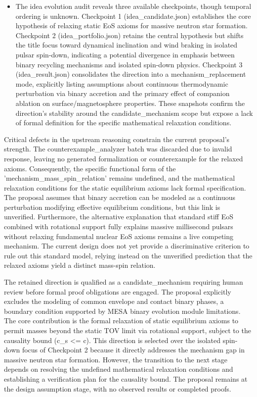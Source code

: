 \documentclass[conference]{IEEEtran}
\begin{document}
\begin{itemize}
\item The idea evolution audit reveals three available checkpoints, though temporal ordering is unknown. Checkpoint 1 (idea\_candidate.json) establishes the core hypothesis of relaxing static EoS axioms for massive neutron star formation. Checkpoint 2 (idea\_portfolio.json) retains the central hypothesis but shifts the title focus toward dynamical inclination and wind braking in isolated pulsar spin-down, indicating a potential divergence in emphasis between binary recycling mechanisms and isolated spin-down physics. Checkpoint 3 (idea\_result.json) consolidates the direction into a mechanism\_replacement mode, explicitly listing assumptions about continuous thermodynamic perturbation via binary accretion and the primary effect of companion ablation on surface/magnetosphere properties. These snapshots confirm the direction's stability around the candidate\_mechanism scope but expose a lack of formal definition for the specific mathematical relaxation conditions.
\end{itemize}

Critical defects in the upstream reasoning constrain the current proposal's strength. The counterexample\_analyzer batch was discarded due to invalid response, leaving no generated formalization or counterexample for the relaxed axioms. Consequently, the specific functional form of the 'mechanism\_mass\_spin\_relation' remains undefined, and the mathematical relaxation conditions for the static equilibrium axioms lack formal specification. The proposal assumes that binary accretion can be modeled as a continuous perturbation modifying effective equilibrium conditions, but this link is unverified. Furthermore, the alternative explanation that standard stiff EoS combined with rotational support fully explains massive millisecond pulsars without relaxing fundamental nuclear EoS axioms remains a live competing mechanism. The current design does not yet provide a discriminative criterion to rule out this standard model, relying instead on the unverified prediction that the relaxed axioms yield a distinct mass-spin relation.

The retained direction is qualified as a candidate\_mechanism requiring human review before formal proof obligations are engaged. The proposal explicitly excludes the modeling of common envelope and contact binary phases, a boundary condition supported by MESA binary evolution module limitations. The core contribution is the formal relaxation of static equilibrium axioms to permit masses beyond the static TOV limit via rotational support, subject to the causality bound (c\_s <= c). This direction is selected over the isolated spin-down focus of Checkpoint 2 because it directly addresses the mechanism gap in massive neutron star formation. However, the transition to the next stage depends on resolving the undefined mathematical relaxation conditions and establishing a verification plan for the causality bound. The proposal remains at the design assumption stage, with no observed results or completed proofs.~\cite{cite_c369df652181e8f7}
\end{document}
